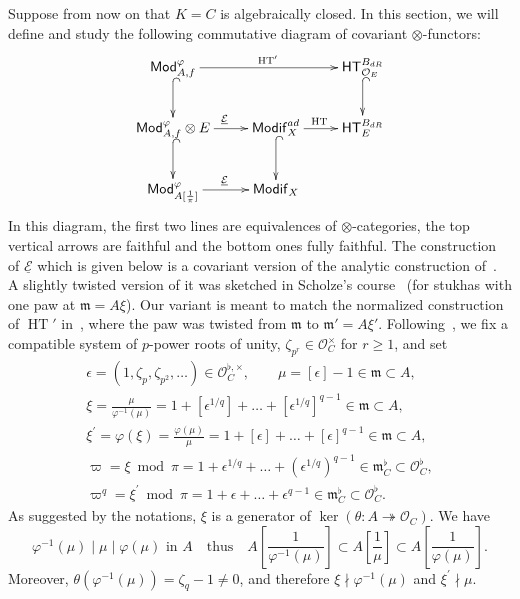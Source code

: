 \documentclass[11pt]{article}
\theoremstyle{definition}
\numberwithin{equation}{section}
\numberwithin{figure}{section}
\numberwithin{table}{section}
\newcommand{\Mod}{\mathsf{Mod}}
\newcommand{\Modif}{\mathsf{Modif}}
\newcommand{\HT}{\mathsf{HT}}
\DeclareMathOperator{\HTT}{HT}
\newcommand*{\dR}{dR}
\begin{document}
Suppose from now on that $K=C$ is algebraically closed. In this section, we will define and study the following commutative diagram of covariant $\otimes$-functors:
\[
\xymatrix{\Mod_{A,f}^{\varphi}\ar[rr]^{\HTT'}\ar@{^{(}->}[d] & & \HT_{\mathcal{O}_{E}}^{B_{\dR}}\ar@{^{(}->}[d]\\
\Mod_{A,f}^{\varphi}\otimes E\ar[r]^{\underline{\mathcal{E}}}\ar@{^{(}->}[d] & \Modif_{X}^{ad}\ar[r]^{\HTT}\ar@{^{(}->}[d] & \HT_{E}^{B_{\dR}}\\
\Mod_{A[\frac{1}{\pi}]}^{\varphi}\ar[r]^{\underline{\mathcal{E}}} & \Modif_{X} }
\]
In this diagram, the first two lines are equivalences of $\otimes$-categories, the top vertical arrows are faithful and the bottom ones fully faithful. The construction of $\underline{\mathcal{E}}$ which is given below is a covariant version of the analytic construction of~\cite{Fa15}. A slightly twisted version of it was sketched in Scholze's course~\cite{ScWe15} (for stukhas with one paw at $\mathfrak{m}=A\xi$). Our variant is meant to match the normalized construction of $\HTT'$ in~\cite{BaMoSc16}, where the paw was twisted from $\mathfrak{m}$ to $\mathfrak{m}'=A\xi'$. Following~\cite{BaMoSc16}, we fix a compatible system of $p$-power roots of unity, $\zeta_{p^{r}}\in\mathcal{O}_{C}^{\times}$ for $r\geq1$, and set
\begin{gather*}
\epsilon=(1,\zeta_{p},\zeta_{p^{2}},\dots)\in\mathcal{O}_{C}^{\flat,\times},\qquad\mu=[\epsilon]-1\in\mathfrak{m}\subset A,
\\
\xi={\frac{\mu}{\varphi^{-1}(\mu)}}=1+[\epsilon^{1/q}]+\dots+[\epsilon^{1/q}]^{q-1}\in\mathfrak{m}\subset A,
\\
\xi^{\prime}=\varphi(\xi)={\frac{\varphi(\mu)}{\mu}}=1+[\epsilon]+\dots+[\epsilon]^{q-1}\in\mathfrak{m}\subset A,
\\
\varpi=\xi\bmod\pi=1+\epsilon^{1/q}+\dots+(\epsilon^{1/q})^{q-1}\in\mathfrak{m}_{C}^{\flat}\subset\mathcal{O}_{C}^{\flat},
\\
\varpi^{q}=\xi^{\prime}\bmod\pi=1+\epsilon+\dots+\epsilon^{q-1}\in\mathfrak{m}_{C}^{\flat}\subset\mathcal{O}_{C}^{\flat}.
\end{gather*}
As suggested by the notations, $\xi$ is a generator of $\ker(\theta:A\twoheadrightarrow\mathcal{O}_{C})$. We have
\[
\varphi^{-1}(\mu)\mid\mu\mid\varphi(\mu)\,\,\text{in }A\quad\text{thus}\quad A\!\left[\frac{1}{\varphi^{-1}(\mu)}\right]\subset A\!\left[\frac{1}{\mu}\right]\subset A\!\left[\frac{1}{\varphi(\mu)}\right].
\]
Moreover, $\theta(\varphi^{-1}(\mu))=\zeta_{q}-1\neq0$, and therefore $\xi\nmid\varphi^{-1}(\mu)$ and $\xi^{\prime}\nmid\mu$.
\end{document}
